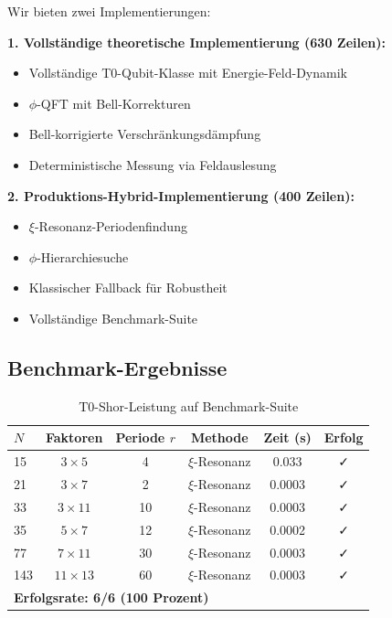 Wir bieten zwei Implementierungen:

\textbf{1. Vollständige theoretische Implementierung (630 Zeilen):}
\begin{itemize}
	\item Vollständige T0-Qubit-Klasse mit Energie-Feld-Dynamik
	\item $\phi$-QFT mit Bell-Korrekturen
	\item Bell-korrigierte Verschränkungsdämpfung
	\item Deterministische Messung via Feldauslesung
\end{itemize}

\textbf{2. Produktions-Hybrid-Implementierung (400 Zeilen):}
\begin{itemize}
	\item $\xi$-Resonanz-Periodenfindung
	\item $\phi$-Hierarchiesuche
	\item Klassischer Fallback für Robustheit
	\item Vollständige Benchmark-Suite
\end{itemize}

\subsection{Benchmark-Ergebnisse}

\begin{table}[h]
	\centering
	\caption{T0-Shor-Leistung auf Benchmark-Suite}
	\label{tab:benchmark}
	\begin{tabular}{@{}lccccc@{}}
		\toprule
		$N$ & Faktoren & Periode $r$ & Methode & Zeit (s) & Erfolg \\
		\midrule
		15 & $3 \times 5$ & 4 & $\xi$-Resonanz & 0.033 & ✓ \\
		21 & $3 \times 7$ & 2 & $\xi$-Resonanz & 0.0003 & ✓ \\
		33 & $3 \times 11$ & 10 & $\xi$-Resonanz & 0.0003 & ✓ \\
		35 & $5 \times 7$ & 12 & $\xi$-Resonanz & 0.0002 & ✓ \\
		77 & $7 \times 11$ & 30 & $\xi$-Resonanz & 0.0003 & ✓ \\
		143 & $11 \times 13$ & 60 & $\xi$-Resonanz & 0.0003 & ✓ \\
		\midrule
		\multicolumn{5}{l}{\textbf{Erfolgsrate: 6/6 (100 Prozent)}} \\
		\bottomrule
	\end{tabular}
\end{table}

